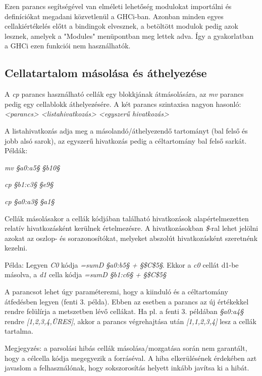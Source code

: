 Ezen parancs segítségével van elméleti lehetőség modulokat importálni és definíciókat megadani közvetlenül a GHCi-ban. Azonban minden egyes cellakiértékelés előtt a bindingok elvesznek, a betöltött modulok pedig azok lesznek, amelyek a "Modules" menüpontban meg lettek adva. Így a gyakorlatban a GHCi ezen funkciói nem használhatók.

\subsection{Cellatartalom másolása és áthelyezése}

A \textit{cp} parancs használható cellák egy blokkjának átmásolására, az \textit{mv} parancs pedig egy cellablokk áthelyezésére. A két parancs szintaxisa nagyon hasonló: \textit{<parancs> <listahivatkozás> <egyszerű hivatkozás>}

A listahivatkozás adja meg a másolandó/áthelyezendő tartományt (bal felső és jobb alsó sarok), az egyszerű hivatkozás pedig a céltartomány bal felső sarkát. Példák:
\begin{compactenum}
	\item \textit{mv §a0:a5§ §b10§}
	\item \textit{cp §b1:c3§ §e9§}
	\item \textit{cp §a0:a3§ §a1§}
\end{compactenum}

Cellák másolásakor a cellák kódjában található hivatkozások alapértelmezetten relatív hivatkozásként kerülnek értelmezésre. A hivatkozásokban \textit{\$}-ral lehet jelölni azokat az oszlop- és sorazonosítókat, melyeket abszolút hivatkozásként szeretnénk kezelni.

Példa:
Legyen \textit{C0} kódja \textit{=sumD §a0:b5§ + §\$C\$5§}. Ekkor a \textit{c0} cellát {d1}-be másolva, a \textit{d1} cella kódja \textit{=sumD §b1:c6§ + §\$C\$5§}

A parancsot lehet úgy paraméterezni, hogy a kiinduló és a céltartomány átfedésben legyen (fenti 3. példa). Ebben az esetben a parancs az új értékekkel rendre felülírja a metszetben lévő cellákat. Ha pl. a fenti 3. példában \textit{§a0:a4§} rendre \textit{[1,2,3,4,ÜRES]}, akkor a parancs végrehajtása után \textit{[1,1,2,3,4]} lesz a cellák tartalma.

Megjegyzés: a parsolási hibás cellák másolása/mozgatása során nem garantált, hogy a célcella kódja megegyezik a forráséval. A hiba elkerülésének érdekében azt javaslom a felhasználónak, hogy sokszorosítás helyett inkább javítsa ki a hibát. 